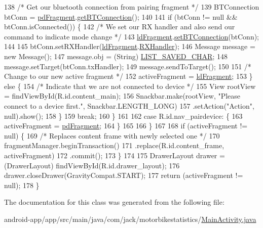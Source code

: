 \begin{DoxyCode}
138                 \textcolor{comment}{/* Get our bluetooth connection from pairing fragment */}
139                 BTConnection btConn = \hyperlink{class_android_app_1_1_main_activity_a6dea684256a0cd0f73f87546ec2b0de2}{pdFragment}.\hyperlink{class_android_app_1_1_pair_device_fragment_ae68bfed66a421a3020a257cbc034e42d}{getBTConnection}();
140 
141                 \textcolor{keywordflow}{if} (btConn != null && btConn.isConnected()) \{
142                     \textcolor{comment}{/* We set our RX handler and also send our command to indicate mode change */}
143                     \hyperlink{class_android_app_1_1_main_activity_ad54c7414ab4cb86c81e79f2f0037c694}{ldFragment}.\hyperlink{class_android_app_1_1_load_device_fragment_a77ce93090f6c8c6aac522e35bfe9d21b}{setBTConnection}(btConn);
144 
145                     btConn.setRXHandler(\hyperlink{class_android_app_1_1_main_activity_ad54c7414ab4cb86c81e79f2f0037c694}{ldFragment}.\hyperlink{class_android_app_1_1_load_device_fragment_ad37565ea5a5332faf0c6b12284ca4e6c}{RXHandler});
146                     Message message = \textcolor{keyword}{new} Message();
147                     message.obj = (String) \hyperlink{class_android_app_1_1_main_activity_a559f123628c037642baa46b37f23f5cc}{LIST\_SAVED\_CHAR};
148                     message.setTarget(btConn.txHandler);
149                     message.sendToTarget();
150 
151                     \textcolor{comment}{/* Change to our new active fragment */}
152                     activeFragment = \hyperlink{class_android_app_1_1_main_activity_ad54c7414ab4cb86c81e79f2f0037c694}{ldFragment};
153                 \} \textcolor{keywordflow}{else} \{
154                     \textcolor{comment}{/* Indicate that we are not connected to device */}
155                     View rootView = findViewById(R.id.content\_main);
156                     Snackbar.make(rootView, \textcolor{stringliteral}{"Please connect to a device first."}, Snackbar.LENGTH\_LONG)
157                             .setAction(\textcolor{stringliteral}{"Action"}, null).show();
158                 \}
159                 \textcolor{keywordflow}{break};
160             \}
161 
162             \textcolor{keywordflow}{case} R.id.nav\_pairdevice: \{
163                 activeFragment = \hyperlink{class_android_app_1_1_main_activity_a6dea684256a0cd0f73f87546ec2b0de2}{pdFragment};
164             \}
165 
166         \}
167 
168         \textcolor{keywordflow}{if} (activeFragment != null) \{
169             \textcolor{comment}{/* Replaces content frame with newly selected one */}
170             fragmentManager.beginTransaction()
171                     .replace(R.id.content\_frame, activeFragment)
172                     .commit();
173         \}
174 
175         DrawerLayout drawer = (DrawerLayout) findViewById(R.id.drawer\_layout);
176         drawer.closeDrawer(GravityCompat.START);
177         \textcolor{keywordflow}{return} (activeFragment != null);
178     \}
\end{DoxyCode}


The documentation for this class was generated from the following file\+:\begin{DoxyCompactItemize}
\item 
android-\/app/app/src/main/java/com/jack/motorbikestatistics/\hyperlink{_main_activity_8java}{Main\+Activity.\+java}\end{DoxyCompactItemize}
